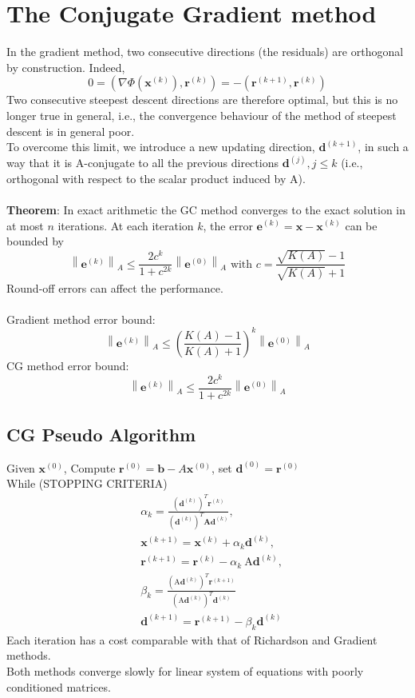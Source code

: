 \documentclass[11pt]{book}
\begin{document}
\section*{The Conjugate Gradient method}
In the gradient method, two consecutive directions (the residuals) are orthogonal by construction. Indeed,
$$
0=\left(\nabla \Phi\left(\mathbf{x}^{(k)}\right), \mathbf{r}^{(k)}\right)=-\left(\mathbf{r}^{(k+1)}, \mathbf{r}^{(k)}\right)
$$
Two consecutive steepest descent directions are therefore optimal, but this is no longer true in general, i.e., the convergence behaviour of the method of steepest descent is in general poor.\\
To overcome this limit, we introduce a new updating direction, $\mathbf{d}^{(k+1)}$, in such a way that it is A-conjugate to all the previous directions $\mathbf{d}^{(j)}, j \leq k$ (i.e., orthogonal with respect to the scalar product induced by A).\\ \\
\textbf{Theorem}: In exact arithmetic the GC method converges to the exact solution in at most $n$ iterations. At each iteration $k$, the error $\mathbf{e}^{(k)}=\mathbf{x}-\mathbf{x}^{(k)}$ can be bounded by
$$
\left\|\boldsymbol{e}^{(k)}\right\|_{A} \leq \frac{2 c^{k}}{1+c^{2 k}}\left\|\boldsymbol{e}^{(0)}\right\|_{A} \text { with } c=\frac{\sqrt{K(A)}-1}{\sqrt{K(A)}+1}
$$
Round-off errors can affect the performance. \\ \\
Gradient method error bound:
$$
\left\|\boldsymbol{e}^{(k)}\right\|_{A} \leq\left(\frac{K(A)-1}{K(A)+1}\right)^{k}\left\|\boldsymbol{e}^{(0)}\right\|_{A}
$$
CG method error bound:
$$
\left\|\boldsymbol{e}^{(k)}\right\|_{A} \leq \frac{2 c^{k}}{1+c^{2 k}}\left\|\boldsymbol{e}^{(0)}\right\|_{A}
$$
\subsection*{CG Pseudo Algorithm}
Given $\mathbf{x}^{(0)}$, Compute $\mathbf{r}^{(0)}=\mathbf{b}-A \mathbf{x}^{(0)}$, set $\mathbf{d}^{(0)}=\mathbf{r}^{(0)}$ \\ 
While (STOPPING CRITERIA)
$$
\begin{aligned}
& \alpha_{k}=\frac{\left(\mathbf{d}^{(k)}\right)^{T} \mathbf{r}^{(k)}}{\left(\mathbf{d}^{(k)}\right)^{T} \mathbf{A} \mathbf{d}^{(k)}}, \\
& \mathbf{x}^{(k+1)}=\mathbf{x}^{(k)}+\alpha_{k} \mathbf{d}^{(k)}, \\
& \mathbf{r}^{(k+1)}=\mathbf{r}^{(k)}-\alpha_{k} \mathrm{~A} \mathbf{d}^{(k)}, \\
& \beta_{k}=\frac{\left(\mathrm{A} \mathbf{d}^{(k)}\right)^{T} \mathbf{r}^{(k+1)}}{\left(\mathrm{A} \mathbf{d}^{(k)}\right)^{T} \mathbf{d}^{(k)}} \\
& \mathbf{d}^{(k+1)}=\mathbf{r}^{(k+1)}-\beta_{k} \mathbf{d}^{(k)}
\end{aligned}
$$
Each iteration has a cost comparable with that of Richardson and Gradient methods.\\
Both methods converge slowly for linear system of equations with poorly conditioned matrices.
\end{document}
